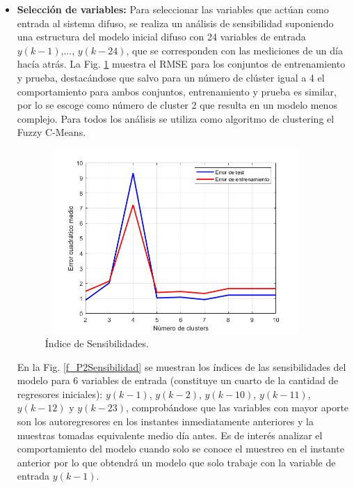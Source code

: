 \documentclass[12pt]{article}
\begin{document}
\begin{itemize}
	\item \textbf{Selección de variables:}
Para seleccionar las variables que actúan como entrada al sistema difuso, se realiza un análisis de sensibilidad suponiendo una estructura del modelo inicial difuso con 24 variables de entrada $y(k-1)$,..., $y(k-24)$, que se corresponden con las mediciones de un día hacía atrás. La Fig. \ref{f_P2reglas24} muestra el RMSE para los conjuntos de entrenamiento y prueba, destacándose que salvo para un número de clúster igual a 4 el comportamiento para ambos conjuntos, entrenamiento y prueba es similar, por lo se escoge como número de cluster 2 que resulta en un modelo menos complejo. Para todos los análisis se utiliza como algoritmo de clustering el Fuzzy C-Means.

\begin{figure}[h!]
\centering
\includegraphics[width=10cm,height=7cm]{imag/P2/cluster24}
\caption{Índice de Sensibilidades.}
\label{f_P2reglas24}
\end{figure}

En la Fig. \ref{f_P2Sensibilidad} se muestran los índices de las sensibilidades del modelo para 6
variables de entrada (constituye un cuarto de la cantidad de regresores iniciales): $y(k-1)$, $y(k-2)$, $y(k-10)$, $y(k-11)$, $y(k-12)$ y $y(k-23)$, comprobándose que las variables con mayor aporte son los autoregresores en los instantes inmediatamente anteriores y la muestras tomadas equivalente medio día antes. Es de interés analizar el comportamiento del modelo cuando solo se conoce el muestreo en el instante anterior por lo que obtendrá un modelo que solo trabaje con la variable de entrada $y(k-1)$.


\end{itemize}
\end{document}
